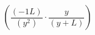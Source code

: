 \documentclass{article}
\begin{document}
\begin{equation}
\left(\frac{\left(-1L\right)}{\left(y^{2}\right)} \cdot \frac{y}{\left(y + L\right)}\right)
\end{equation}
\end{document}
